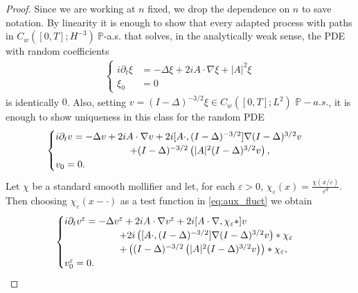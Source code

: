\documentclass[a4paper,10pt]{amsart}
\renewcommand{\epsilon}{\varepsilon}
\theoremstyle{remark}
\numberwithin{equation}{section}
\begin{document}
\begin{proof}
Since we are working at $n$ fixed, we drop the dependence on $n$ to save notation.
    By linearity it is enough to show that every adapted process with paths
    in $C_w([0,T];H^{-3})\ \mathbb{P}$-a.s. that solves, in the analytically
    weak sense, the PDE with random coefficients
    \begin{align*}
        \begin{cases}
            i\partial_t\xi&=-\Delta\xi+ 2iA\cdot\nabla \xi+|A|^2\xi\\
            \xi_0&=0
        \end{cases}
    \end{align*}
    is identically $0$. Also, setting
    $v=(I-\Delta)^{-3/2}\xi\in C_w([0,T];L^2)$ $\mathbb{P}-a.s.$, it is
    enough to show uniqueness in this class for the random PDE
    \begin{align}\label{eq:aux_fluct}
        \begin{cases}
            i\partial_t v=-\Delta v+2iA\cdot\nabla v
            +2i[A\cdot,(I-\Delta)^{-3/2}]
            \nabla(I-\Delta)^{3/2}v\\
            \hspace{27mm}
            +(I-\Delta)^{-3/2}
            \left(|A|^2(I-\Delta)^{3/2}v\right),\\
            v_0=0.
        \end{cases}
    \end{align}
     Let $\chi$ be a standard smooth mollifier and let, for each $\epsilon>0$, $\chi_{\epsilon}(x)=\frac{\chi(x/\epsilon)}{\epsilon^d}$. Then choosing $\chi_\epsilon(x-\cdot)$ as a test function in \eqref{eq:aux_fluct} we obtain
\begin{align*}
	     \begin{cases}
	            i\partial_t v^{\epsilon}=-\Delta v^{\epsilon}
	            +2iA\cdot\nabla v^{\epsilon}
	            +2i[A\cdot\nabla,\chi_{\epsilon}\ast]v\\
	            \hspace{20mm}
	            +2i\left([A\cdot,(I-\Delta)^{-3/2}]
	            \nabla(I-\Delta)^{3/2}v\right)\ast\chi_{\epsilon}\\
	            \hspace{20mm}
	            +\left((I-\Delta)^{-3/2}
	            \left(|A|^2(I-\Delta)^{3/2}v\right)\right)
	            \ast\chi_{\epsilon},\\
	            v^{\epsilon}_0=0.
	        \end{cases}

\end{align*}
\end{proof}
\end{document}
